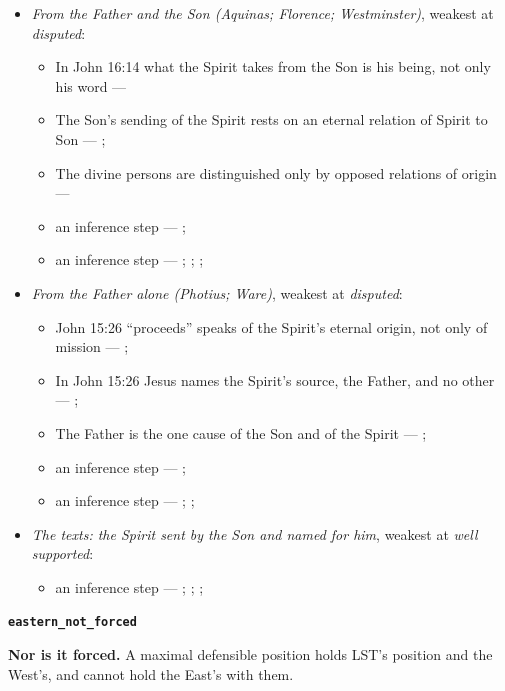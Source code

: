 \documentclass[11pt,paper=\testimonypaper,DIV=13,parskip=false]{scrartcl}
\begin{document}
\begin{itemize}
\item \emph{From the Father and the Son (Aquinas; Florence; Westminster)}, weakest at \emph{disputed}:
\begin{itemize}
\item In John 16:14 what the Spirit takes from the Son is his being, not only his word --- \cite[I, q. 36, a. 2]{aquinas-summa-1920}
\item The Son’s sending of the Spirit rests on an eternal relation of Spirit to Son --- \cite[I, q. 36, a. 2]{aquinas-summa-1920}; \cite[165]{vischer-spirit-of-god-1981}
\item The divine persons are distinguished only by opposed relations of origin --- \cite[I, q. 36, a. 2]{aquinas-summa-1920}
\item an inference step --- \cite[I, q. 36, a. 2]{aquinas-summa-1920}; \cite{photius-mystagogy-1987}
\item an inference step --- \cite[165--169]{vischer-spirit-of-god-1981}; \cite[144]{vischer-spirit-of-god-1981}; \cite[183--184]{vischer-spirit-of-god-1981}; \cite[I, q. 43, a. 8]{aquinas-summa-1920}
\end{itemize}
\item \emph{From the Father alone (Photius; Ware)}, weakest at \emph{disputed}:
\begin{itemize}
\item John 15:26 “proceeds” speaks of the Spirit’s eternal origin, not only of mission --- \cite[I, q. 36, a. 2]{aquinas-summa-1920}; \cite{photius-mystagogy-1987}
\item In John 15:26 Jesus names the Spirit’s source, the Father, and no other --- \cite{photius-mystagogy-1987}; \cite{ware-orthodox-church-1993}
\item The Father is the one cause of the Son and of the Spirit --- \cite{photius-mystagogy-1987}; \cite{ware-orthodox-church-1993}
\item an inference step --- \cite{photius-mystagogy-1987}; \cite[I, q. 36, a. 2]{aquinas-summa-1920}
\item an inference step --- \cite[Florence, Session 6 (1439), Laetentur caeli]{tanner-decrees-1990}; \cite{pcpcu-greek-latin-traditions-1995}; \cite{photius-mystagogy-1987}
\end{itemize}
\item \emph{The texts: the Spirit sent by the Son and named for him}, weakest at \emph{well supported}:
\begin{itemize}
\item an inference step --- \cite[3, The Triune God]{kibbey-living-systematic-theology-2026}; \cite{photius-mystagogy-1987}; \cite[178]{vischer-spirit-of-god-1981}; \cite[I, q. 36, a. 2]{aquinas-summa-1920}
\end{itemize}
\end{itemize}
\par\medskip\noindent\textbf{\texttt{eastern\_\allowbreak{}not\_\allowbreak{}forced}}\par\nobreak\noindent
\textbf{Nor is it forced.} A maximal defensible position holds LST’s position and the West’s, and cannot hold the East’s with them.
\end{document}
